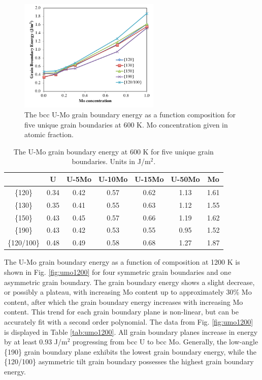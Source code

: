 \documentclass[review]{elsarticle}
\begin{document}
\begin{figure}[h]
 \centering
 \includegraphics[width=0.6\textwidth]{uvsmo600A.png} 
 \caption{The bcc U-Mo grain boundary energy as a function composition for five unique grain boundaries at 600 K. Mo concentration given in atomic fraction.}
 \label{fig:umo600}
\end{figure}

\FloatBarrier

\begin{table}[h]
\caption{The U-Mo grain boundary energy at 600 K for five unique grain boundaries. Units in J/m$^{2}$. } \label{tab:umo600}
\begin{center}
\begin{tabular}{|c|c|c|c|c|c|c|}
	\hline
 & U & U-5Mo & U-10Mo & U-15Mo & U-50Mo & Mo \\
\hline
\{120\} & 0.34 & 0.42 & 0.57 & 0.62 & 1.13 & 1.61 \\
\{130\} & 0.35 & 0.41 & 0.55 & 0.63 & 1.12 & 1.55 \\ 
\{150\} & 0.43 & 0.45 & 0.57 & 0.66 & 1.19 & 1.62 \\ 
\{190\}	 & 0.43 & 0.42 & 0.53 & 0.55 & 0.95 & 1.52 \\ 
\{120/100\} & 0.48 & 0.49 & 0.58 & 0.68 & 1.27 & 1.87 \\
 	 \hline
\end{tabular}
\end{center}
\label{default}
\end{table}

\FloatBarrier

The U-Mo grain boundary energy as a function of composition at 1200 K is shown in Fig. \ref{fig:umo1200} for four symmetric grain boundaries and one asymmetric grain boundary. The grain boundary energy shows a slight decrease, or possibly a plateau, with increasing Mo content up to approximately 30\% Mo content, after which the grain boundary energy increases with increasing Mo content. This trend for each grain boundary plane is non-linear, but can be accurately fit with a second order polynomial. The data from Fig. \ref{fig:umo1200} is displayed in Table \ref{tab:umo1200}. All grain boundary planes increase in energy by at least 0.93 J/m$^{2}$ progressing from bcc U to bcc Mo. Generally, the low-angle \{190\} grain boundary plane exhibits the lowest grain boundary energy, while the \{120/100\} asymmetric tilt grain boundary possesses the highest grain boundary energy.
\end{document}
